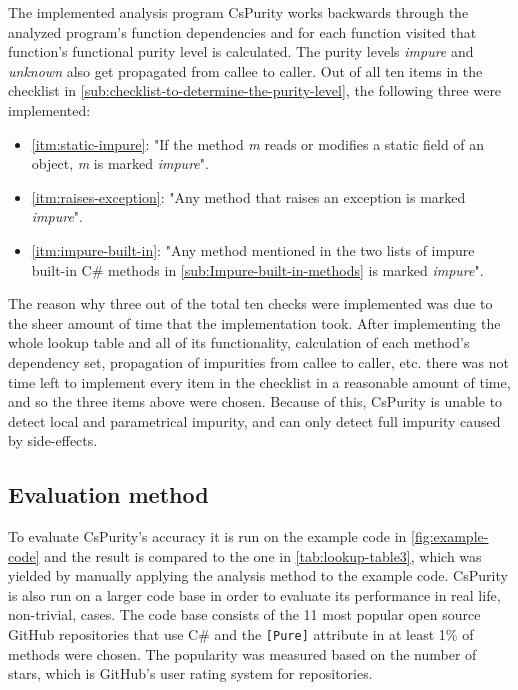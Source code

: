 \documentclass[a4paper,12pt]{article}
\begin{document}
The implemented analysis program CsPurity works backwards through the analyzed program's function dependencies and for each function visited that function's functional purity level is calculated. The purity levels \textit{impure} and \textit{unknown} also get propagated from callee to caller. Out of all ten items in the checklist in \autoref{sub:checklist-to-determine-the-purity-level}, the following three were implemented:

\begin{itemize}
  \item \autoref{itm:static-impure}: "If the method \textit{m} reads or modifies a static field of an object, \textit{m} is marked \textit{impure}".
  \item \autoref{itm:raises-exception}: "Any method that raises an exception is marked \textit{impure}".
  \item \autoref{itm:impure-built-in}: "Any method mentioned in the two lists of impure built-in C\# methods in \autoref{sub:Impure-built-in-methods} is marked \textit{impure}".
\end{itemize}

The reason why three out of the total ten checks were implemented was due to the sheer amount of time that the implementation took. After implementing the whole lookup table and all of its functionality, calculation of each method's dependency set, propagation of impurities from callee to caller, etc. there was not time left to implement every item in the checklist in a reasonable amount of time, and so the three items above were chosen. Because of this, CsPurity is unable to detect local and parametrical impurity, and can only detect full impurity caused by side-effects.

\subsection{Evaluation method} \label{sub:evaluation-method}

To evaluate CsPurity's accuracy it is run on the example code in \autoref{fig:example-code} and the result is compared to the one in \autoref{tab:lookup-table3}, which was yielded by manually applying the analysis method to the example code. CsPurity is also run on a larger code base in order to evaluate its performance in real life, non-trivial, cases. The code base consists of the 11 most popular open source GitHub repositories that use C\# and the \texttt{[Pure]} attribute in at least 1\% of methods were chosen. The popularity was measured based on the number of stars, which is GitHub's user rating system for repositories.
\end{document}
